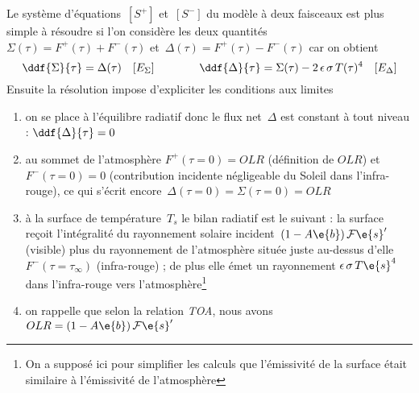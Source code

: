 \sk
Le système d'équations~$[S^+]$ et~$[S^-]$ du modèle à deux faisceaux
est plus simple à résoudre si l'on considère les deux quantités~$\Sigma(\tau)=F^{+}(\tau)+F^{-}(\tau)$ et~$\Delta(\tau)=F^{+}(\tau)-F^{-}(\tau)$ car on obtient
\[
\ddf{\Sigma}{\tau} = \Delta(\tau) \quad [E_\Sigma] 
\qquad\qquad 
\ddf{\Delta}{\tau} = \Sigma(\tau) - 2\,\epsilon\,\sigma\,T(\tau)^4 \quad [E_\Delta]
\]
\noindent Ensuite la résolution impose d'expliciter les conditions aux limites
\begin{enumerate}[label=$\mathcal{C}_\arabic*$]
\item on se place à l'équilibre radiatif donc le flux net~$\Delta$ est constant à tout niveau : $\ddf{\Delta}{\tau}=0$
\item au sommet de l'atmosphère $F^+(\tau=0) = OLR$ (définition de $OLR$) et $F^-(\tau=0) = 0$ (contribution
incidente négligeable du Soleil dans l'infra-rouge), ce qui s'écrit encore~$\Delta(\tau=0)=\Sigma(\tau=0)=OLR$
\item à la surface de température~$T_s$ le bilan radiatif est le suivant : la surface reçoit l'intégralité du rayonnement
solaire incident~$(1-A\e{b}) \, \mathcal{F}\e{s}'$ (visible) plus du rayonnement de l'atmosphère située
juste au-dessus d'elle~$F^-(\tau=\tau_{\infty})$ (infra-rouge) ; de plus elle émet un rayonnement
$\epsilon\,\sigma\,T\e{s}^4$ dans l'infra-rouge vers l'atmosphère\footnote{On a supposé ici pour simplifier les calculs que l'émissivité
de la surface était similaire à l'émissivité de l'atmosphère}
\item on rappelle que selon la relation \emph{TOA}, nous avons $OLR = (1-A\e{b}) \, \mathcal{F}\e{s}'$
\end{enumerate}
